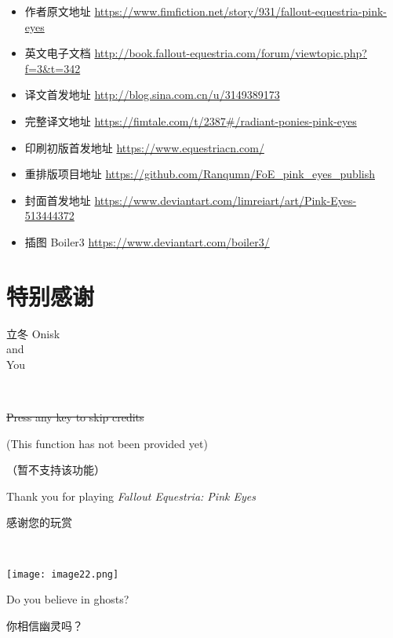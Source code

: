 \begin{itemize}
    \item 作者原文地址 \url{https://www.fimfiction.net/story/931/fallout-equestria-pink-eyes}
    \item 英文电子文档 \url{http://book.fallout-equestria.com/forum/viewtopic.php?f=3\&t=342}
    \item 译文首发地址 \url{http://blog.sina.com.cn/u/3149389173}
    \item 完整译文地址 \url{https://fimtale.com/t/2387\#/radiant-ponies-pink-eyes}
    \item 印刷初版首发地址 \url{https://www.equestriacn.com/}
    \item 重排版项目地址 \url{https://github.com/Ranqumn/FoE_pink_eyes_publish}
    \item 封面首发地址 \url{https://www.deviantart.com/limreiart/art/Pink-Eyes-513444372}
    \item 插图 Boiler3 \url{https://www.deviantart.com/boiler3/}
\end{itemize}


\section*{特别感谢}

\begin{center}
    立冬 \quad Onisk \bigskip \\
    and \bigskip \\
    You
\end{center}

\clearpage

~\vfill

\begin{center}
\sout{Press any key to skip credits}

(This function has not been provided yet)

\smallskip


（暂不支持该功能）

\medskip

Thank you for playing \emph{Fallout Equestria: Pink Eyes}

\smallskip

感谢您的玩赏
\end{center}

~\vfill

\texttt{[image: image22.png]}

\begin{motto}
    Do you believe in ghosts?

    你相信幽灵吗？
\end{motto}

